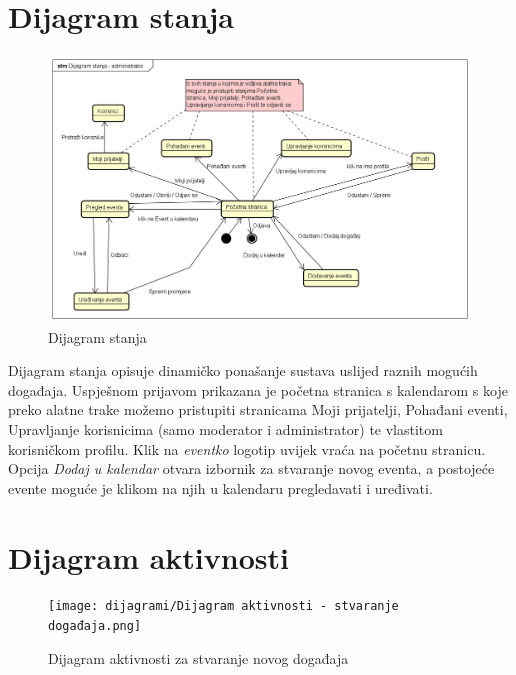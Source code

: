 			\eject

		
			\section{Dijagram stanja}
			
				\begin{figure}[H]
					\includegraphics[width=\textwidth]{dijagrami/Dijagram stanja - administrator.png}
					\caption{Dijagram stanja}
				\end{figure}

				\indent Dijagram stanja opisuje dinamičko ponašanje sustava uslijed raznih mogućih događaja. Uspješnom prijavom prikazana je početna stranica s kalendarom s koje preko alatne trake možemo pristupiti stranicama Moji prijatelji, Pohađani eventi, Upravljanje korisnicima (samo moderator i administrator) te vlastitom korisničkom profilu. Klik na \textit{eventko} logotip uvijek vraća na početnu stranicu. Opcija \textit{Dodaj u kalendar} otvara izbornik za stvaranje novog eventa, a postojeće evente moguće je klikom na njih u kalendaru pregledavati i uređivati.
			
				\eject 
		
			\section{Dijagram aktivnosti}
			
				\begin{figure}[H]
					\texttt{[image: dijagrami/Dijagram aktivnosti - stvaranje događaja.png]}
					\caption{Dijagram aktivnosti za stvaranje novog događaja}
				\end{figure}
			
